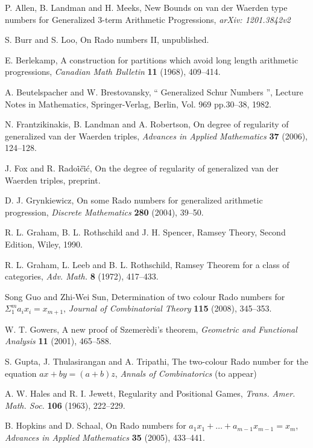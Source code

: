\documentclass[12pt]{report}
\begin{document}
\begin{thebibliography}{99}


P. Allen, B. Landman and H. Meeks, New Bounds on van der Waerden type numbers for Generalized $3$-term Arithmetic Progressions, {\it arXiv: 1201.3842v2}


S. Burr and S. Loo, On Rado numbers II, unpublished.

E. Berlekamp, A construction for partitions which avoid long length arithmetic progressions, {\it Canadian Math Bulletin\/} {\bf 11} (1968), 409--414.


A. Beutelspacher and W. Brestovansky, `` Generalized Schur Numbers '', Lecture Notes in Mathematics, Springer-Verlag, Berlin, Vol. 969   pp.30--38, 1982. 

N. Frantzikinakis, B. Landman and A. Robertson, On degree of regularity of generalized van der Waerden triples, {\it Advances in Applied Mathematics\/} {\bf 37} (2006), 124--128.

J. Fox and R. Rado\. {i}\v {c}\. {i}\' {c}, On the degree of regularity of generalized van der Waerden triples, preprint.

D. J. Grynkiewicz, On some Rado numbers for generalized arithmetic progression, {\it Discrete Mathematics\/} {\bf 280} (2004), 39--50.

R. L. Graham, B. L. Rothschild and J. H. Spencer, Ramsey Theory, Second Edition, Wiley, 1990.

R. L. Graham, L. Leeb and B. L. Rothschild, Ramsey Theorem for a class of categories, {\it Adv. Math.\/} {\bf 8} (1972), 417--433.

Song Guo and Zhi-Wei Sun, Determination of two colour Rado numbers for $\Sigma_1^m a_ix_i=x_{m+1}$, {\it Journal of Combinatorial Theory\/} {\bf 115} (2008), 345--353.

W. T. Gowers, A new proof of Szemer\`{e}di's theorem, {\it Geometric and Functional Analysis\/} {\bf 11} (2001), 465--588.

S. Gupta, J. Thulasirangan and A. Tripathi, The two-colour Rado number for the equation $ax+by=(a+b)z$, {\it Annals of Combinatorics\/} (to appear)

A. W. Hales and R. I. Jewett, Regularity and Positional Games, {\it Trans. Amer. Math. Soc.\/} {\bf 106} (1963), 222--229.

B. Hopkins and D. Schaal, On Rado numbers for $a_1x_1+\ldots+a_{m-1}x_{m-1}=x_m$, {\it Advances in Applied Mathematics\/} {\bf35} (2005), 433--441.


\end{thebibliography}
\end{document}
